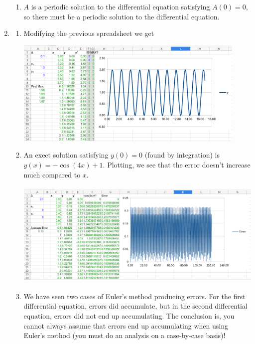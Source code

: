 \begin{enumerate}
\begin{enumerate}
					\item $A$ is a periodic solution to the differential equation satisfying $A(0)=0$, so there must be a periodic solution to
					the differential equation.
			\end{enumerate}
			\item \begin{enumerate}
				\item Modifying the previous spreadsheet we get
					\begin{center}
						\includegraphics[height=2in]{resources/tutorial-01-sheet3a.png}
					\end{center}
				\item An exect solution satisfying $y(0)=0$ (found by integration) is $y(x)=-\cos(4x)+1$.
					Plotting, we see that the error doesn't increase much compared to $x$.
					\begin{center}
						\includegraphics[height=2in]{resources/tutorial-01-sheet3b.png}
					\end{center}
				\item We have seen two cases of Euler's method producing errors. For the first differential equation, errors did accumulate, but in the second
					differential equation, errors did not end up accumulating. The conclusion is, you cannot always assume that errors end up
					accumulating when using Euler's method (you must do an analysis on a case-by-case basis)!

			\end{enumerate}
		\end{enumerate}
